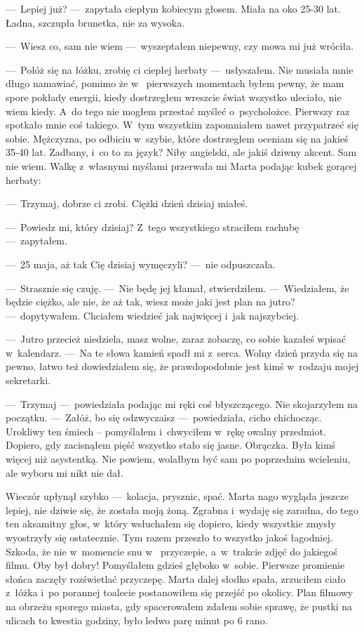 ---~Lepiej już? ---~zapytała ciepłym kobiecym głosem. Miała na oko 25-30 lat. Ładna, szczupła brunetka, nie za wysoka.

---~Wiesz co, sam nie wiem ---~wyszeptałem niepewny, czy mowa mi już wróciła.

---~Połóż się na łóżku, zrobię ci ciepłej herbaty ---~usłyszałem. Nie musiała mnie długo namawiać, pomimo że w~
pierwszych momentach byłem pewny, że mam spore pokłady energii, kiedy dostrzegłem wreszcie świat wszystko uleciało, 
nie wiem kiedy. A~do tego nie mogłem przestać myśleć o~psycholożce. Pierwszy raz spotkało mnie coś takiego. W~tym 
wszystkim zapomniałem nawet przypatrzeć się sobie. Mężczyzna, po odbiciu w~szybie, które dostrzegłem oceniam się na 
jakieś 35-40 lat. Zadbany, i~co to za język? Niby angielski, ale jakiś dziwny akcent. Sam nie wiem. Walkę z~własnymi 
myślami przerwała mi Marta podając kubek gorącej herbaty:

---~Trzymaj, dobrze ci zrobi. Ciężki dzień dzisiaj miałeś.

---~Powiedz mi, który dzisiaj? Z~tego wszystkiego straciłem rachubę ---~zapytałem.

---~25 maja, aż tak Cię dzisiaj wymęczyli? ---~nie odpuszczała.

---~Strasznie się czuję. ---~Nie będę jej kłamał, stwierdziłem. ---~Wiedziałem, że będzie ciężko, ale nie, że aż tak, 
wiesz może jaki jest plan na jutro? ---~dopytywałem. Chciałem wiedzieć jak najwięcej i~jak najszybciej.

---~Jutro przecież niedziela, masz wolne, zaraz zobaczę, co sobie kazałeś wpisać w~kalendarz. ---~Na te słowa kamień 
spadł mi z~serca. Wolny dzień przyda się na pewno, łatwo też dowiedziałem się, że prawdopodobnie jest kimś w~rodzaju 
mojej sekretarki.

---~Trzymaj ---~powiedziała podając mi ręki coś błyszczącego. Nie skojarzyłem na początku. ---~Załóż, bo się 
odzwyczaisz ---~powiedziała, cicho chichocząc. Urokliwy ten śmiech -- pomyślałem i~chwyciłem w~rękę owalny przedmiot. 
Dopiero, gdy zacisnąłem pięść wszystko stało się jasne. Obrączka. Była kimś więcej niż asystentką. Nie powiem, 
wolałbym być sam po poprzednim wcieleniu, ale wyboru mi nikt nie dał.

Wieczór upłynął szybko ---~kolacja, prysznic, spać. Marta nago wygląda jeszcze lepiej, nie dziwie się, że została 
moją żoną. Zgrabna i~wydaję się zaradna, do tego ten aksamitny głos, w~który wsłuchałem się dopiero, kiedy wszystkie 
zmysły wyostrzyły się ostatecznie. Tym razem przeszło to wszystko jakoś łagodniej. Szkoda, że nie w~momencie snu w~
przyczepie, a~w~trakcie zdjęć do jakiegoś filmu. Oby był dobry! Pomyślałem gdzieś głęboko w~sobie. Pierwsze promienie 
słońca zaczęły rozświetlać przyczepę. Marta dalej słodko spała, zrzuciłem ciało z~łóżka i~po porannej toalecie 
postanowiłem się przejść po okolicy. Plan filmowy na obrzeżu sporego miasta, gdy spacerowałem zdałem sobie sprawę, że 
pustki na ulicach to kwestia godziny, było ledwo parę minut po 6 rano.

